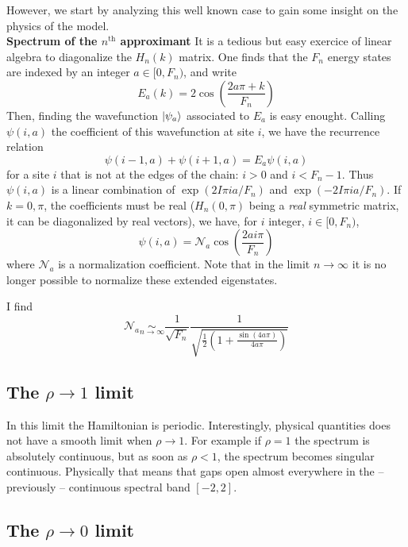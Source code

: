 \documentclass[11pt]{article}
\newcommand{\simlim}[2]{\ensuremath{ \underset{#1 \rightarrow #2}{\sim} }}
\newcommand{\nth}{$n^\text{th}$}
\begin{document}
However, we start by analyzing this well known case to gain some insight on the physics of the model.
\\

\textbf{Spectrum of the \nth{} approximant}
It is a tedious but easy exercice of linear algebra to diagonalize the $H_n(k)$ matrix.
One finds that the $F_n$ energy states are indexed by an integer $a \in [0, F_n)$, and write
\begin{equation}
	E_a(k) = 2 \cos \left( \frac{2 a \pi + k}{F_n} \right)
\end{equation}
Then, finding the wavefunction $\ket{\psi_a}$ associated to $E_a$ is easy enought. Calling $\psi(i,a)$ the coefficient of this wavefunction at site $i$, we have the recurrence relation
\begin{equation}
	\psi(i-1,a) + \psi(i+1,a) = E_a \psi(i,a)
\end{equation}
for a site $i$ that is not at the edges of the chain: $i > 0$ and $i < F_n -1$.
Thus $\psi(i,a)$ is a linear combination of $\exp( 2 I \pi i a/F_n )$ and $\exp( -2 I \pi i a/F_n )$. 
If $k = 0, \pi$, the coefficients must be real ($H_n(0,\pi)$ being a \emph{real} symmetric matrix, it can be diagonalized by real vectors), we have, for $i$ integer, $i \in [0, F_n)$,
\begin{equation}
	\psi(i,a) = \mathcal{N}_a \cos \left( \frac{2 a i \pi}{F_n} \right)
\end{equation}
where $\mathcal{N}_a$ is a normalization coefficient. Note that in the limit $n \rightarrow \infty$ it is no longer possible to normalize these extended eigenstates.

I find
\begin{equation}
	\mathcal{N}_a \simlim{n}{\infty} \frac{1}{\sqrt{F_n}} \frac{1}{\sqrt{\frac{1}{2}\left( 1 + \frac{\sin(4 a \pi)}{4 a \pi} \right)}}
\end{equation}
\subsection{The $\rho \rightarrow 1$ limit}

In this limit the Hamiltonian is periodic. Interestingly, physical quantities does not have a smooth limit when $\rho \rightarrow 1$. 
For example if $\rho = 1$ the spectrum is absolutely continuous, but as soon as $\rho < 1$, the spectrum becomes singular continuous. Physically that means that gaps open almost everywhere in the -- previously -- continuous spectral band $[-2,2]$.

\subsection{The $\rho \rightarrow 0$ limit}
\end{document}
